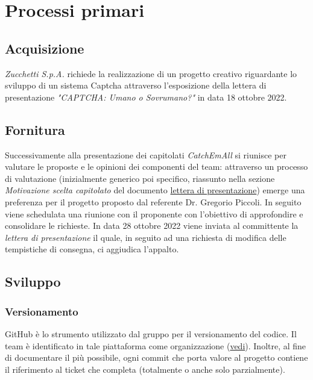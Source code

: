 \section{Processi primari}
\subsection{Acquisizione}
\textit{Zucchetti S.p.A.} richiede la realizzazione di un progetto creativo riguardante lo sviluppo di un sistema Captcha attraverso l'esposizione della lettera di presentazione \textit{"CAPTCHA: Umano o Sovrumano?"} in data 18 ottobre 2022.


\subsection{Fornitura}
Successivamente alla presentazione dei capitolati \textit{CatchEmAll} si riunisce per valutare le proposte e le opinioni dei componenti del team: attraverso un processo di valutazione (inizialmente generico poi specifico, riassunto nella sezione \textit{Motivazione scelta capitolato} del documento \href{https://github.com/catchEmAll-SWE/catchEmAll-Docs/blob/main/Assegnazione appalti/LetteraCandidatura.pdf}{lettera di presentazione}) emerge una preferenza per il progetto proposto dal referente Dr. Gregorio Piccoli.  
\newline
In seguito viene schedulata una riunione con il proponente con l'obiettivo di approfondire e consolidare le richieste. 
\newline
In data 28 ottobre 2022 viene inviata al committente la \textit{lettera di presentazione} il quale, in seguito ad una richiesta di modifica delle tempistiche di consegna, ci aggiudica l'appalto.

\subsection{Sviluppo}
    \subsubsection{Versionamento}
    GitHub è lo strumento utilizzato dal gruppo per il versionamento del codice.
    \newline Il team è identificato in tale piattaforma come organizzazione (\href{https://github.com/catchEmAll-SWE}{vedi}).
    Inoltre, al fine di documentare il più possibile, ogni commit che porta valore al progetto contiene il riferimento al ticket che completa (totalmente o anche solo parzialmente). 
    
